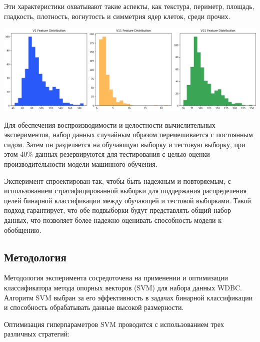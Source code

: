 \documentclass{article}
\begin{document}
Эти характеристики охватывают такие аспекты, как текстура, периметр, площадь, гладкость, плотность, вогнутость и симметрия ядер клеток, среди прочих.

\begin{center}
    \includegraphics[width=\textwidth]{figures/parameters.jpg}
\end{center}

Для обеспечения воспроизводимости и целостности вычислительных экспериментов, набор данных случайным образом перемешивается с постоянным сидом. Затем он разделяется на обучающую выборку и тестовую выборку, при этом 40\% данных резервируются для тестирования с целью оценки производительности модели машинного обучения.

Эксперимент спроектирован так, чтобы быть надежным и повторяемым, с использованием стратифицированной выборки для поддержания распределения целей бинарной классификации между обучающей и тестовой выборками. Такой подход гарантирует, что обе подвыборки будут представлять общий набор данных, что позволяет более надежно оценивать способность модели к обобщению.



\subsection{Методология}
Методология эксперимента сосредоточена на применении и оптимизации классификатора метода опорных векторов (SVM) для набора данных WDBC. Алгоритм SVM выбран за его эффективность в задачах бинарной классификации и способность обрабатывать данные высокой размерности.

Оптимизация гиперпараметров SVM проводится с использованием трех различных стратегий:
\end{document}
